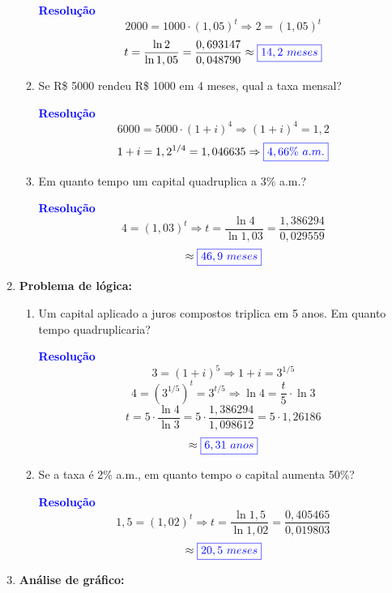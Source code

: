 \documentclass[11pt]{article}
\newcommand{\resposta}[1]{\textcolor{blue}{\boxed{#1}}}
\begin{document}
\begin{multicols}{2}
\begin{enumerate}[leftmargin=*, start=9]
\begin{enumerate}[label=\alph*)]
\textbf{\textcolor{blue}{Resolução}}
\[
2000 = 1000 \cdot (1,05)^t \Rightarrow 2 = (1,05)^t
\]
\[
t = \frac{\ln 2}{\ln 1,05} = \frac{0,693147}{0,048790} \approx \resposta{14,2\ meses}
\]

\item Se R\$ 5000 rendeu R\$ 1000 em 4 meses, qual a taxa mensal?

\textbf{\textcolor{blue}{Resolução}}
\[
6000 = 5000 \cdot (1 + i)^4 \Rightarrow (1 + i)^4 = 1,2
\]
\[
1 + i = 1,2^{1/4} = 1,046635 \Rightarrow \resposta{4,66\%\ a.m.}
\]

\item Em quanto tempo um capital quadruplica a 3\% a.m.?

\textbf{\textcolor{blue}{Resolução}}
\[
    4 = (1,03)^t \Rightarrow t = \frac{\ln 4}{\ln 1,03} = \frac{1,386294}{0,029559} \]
\[\approx \resposta{46,9\ meses}\]
\end{enumerate}

\item \textbf{Problema de lógica:}

\begin{enumerate}[label=\alph*)]
\item Um capital aplicado a juros compostos triplica em 5 anos. Em quanto tempo quadruplicaria?

\textbf{\textcolor{blue}{Resolução}}
\[
3 = (1 + i)^5 \Rightarrow 1 + i = 3^{1/5}
\]
\[
4 = (3^{1/5})^t = 3^{t/5} \Rightarrow \ln 4 = \frac{t}{5} \cdot \ln 3
\]
\[
    t = 5 \cdot \frac{\ln 4}{\ln 3} = 5 \cdot \frac{1,386294}{1,098612} = 5 \cdot 1,26186 \]
\[\approx \resposta{6,31\ anos} \]

\item Se a taxa é 2\% a.m., em quanto tempo o capital aumenta 50\%?

\textbf{\textcolor{blue}{Resolução}}
\[
    1,5 = (1,02)^t \Rightarrow t = \frac{\ln 1,5}{\ln 1,02} = \frac{0,405465}{0,019803} \] 
\[\approx \resposta{20,5\ meses} \]
\end{enumerate}

\item \textbf{Análise de gráfico:}

\begin{center}
\end{center}


\end{enumerate}
\end{multicols}
\end{document}
